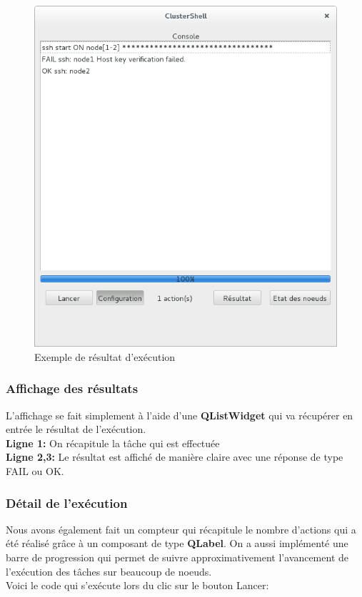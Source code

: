 \documentclass[a4paper,11pt]{article}
\begin{document}
\begin{figure}[H]
\centering
\includegraphics[scale=0.5]{exemple_affichage_console.png}
\caption{Exemple de résultat d'exécution}
\end{figure}
\subsubsection{Affichage des résultats}
\noindent L'affichage se fait simplement à l'aide d'une \textbf{QListWidget} qui va récupérer en entrée le résultat de l'exécution.\\
\textbf{Ligne 1:} On récapitule la tâche qui est effectuée\\
\textbf{Ligne 2,3:} Le résultat est affiché de manière claire avec une réponse de type FAIL ou OK.\\
\linebreak

\subsubsection{Détail de l'exécution}
Nous avons également fait un compteur qui récapitule le nombre d'actions qui a été réalisé grâce à un composant de type \textbf{QLabel}. On a aussi implémenté une barre de progression qui permet de suivre approximativement l'avancement de l'exécution des tâches sur beaucoup de noeuds.\\
Voici le code qui s'exécute lors du clic sur le bouton Lancer:
\end{document}
